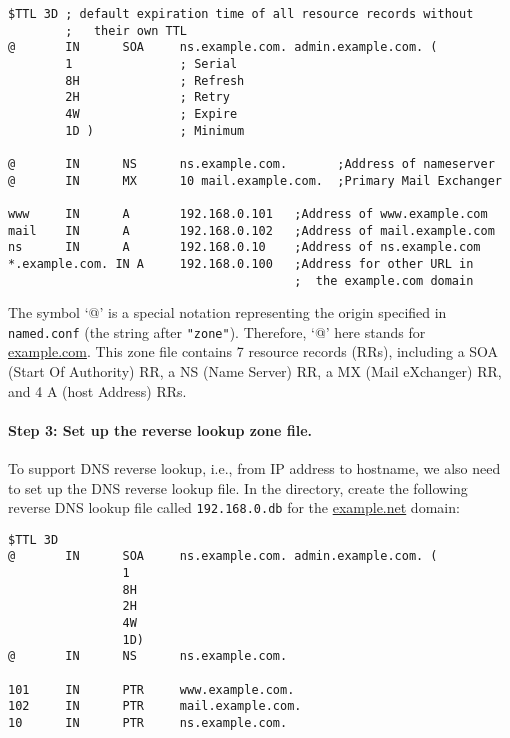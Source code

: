 \vspace{0.2in}
\begin{lstlisting}
$TTL 3D ; default expiration time of all resource records without
        ;   their own TTL
@       IN      SOA     ns.example.com. admin.example.com. (
        1               ; Serial
        8H              ; Refresh
        2H              ; Retry
        4W              ; Expire
        1D )            ; Minimum

@       IN      NS      ns.example.com.       ;Address of nameserver
@       IN      MX      10 mail.example.com.  ;Primary Mail Exchanger

www     IN      A       192.168.0.101   ;Address of www.example.com
mail    IN      A       192.168.0.102   ;Address of mail.example.com
ns      IN      A       192.168.0.10    ;Address of ns.example.com
*.example.com. IN A     192.168.0.100   ;Address for other URL in
                                        ;  the example.com domain
\end{lstlisting}


The symbol `@' is a special notation representing the origin specified
in {\tt named.conf} (the string after \texttt{"zone"}).  Therefore,
`@' here stands for \url{example.com}.
This zone file contains 7 resource records (RRs), including
a SOA (Start Of Authority) RR, a
NS (Name Server) RR, a MX (Mail eXchanger) RR, and 4 A (host Address) RRs.


\paragraph{Step 3: Set up the reverse lookup zone file.}
To support DNS reverse lookup, i.e., from IP address to hostname, we also need to
set up the DNS reverse lookup file.
In the  directory, create the following reverse DNS lookup file
called \texttt{192.168.0.db} for the \url{example.net} domain:
\begin{lstlisting}
$TTL 3D
@       IN      SOA     ns.example.com. admin.example.com. (
                1
                8H
                2H
                4W
                1D)
@       IN      NS      ns.example.com.

101     IN      PTR     www.example.com.
102     IN      PTR     mail.example.com.
10      IN      PTR     ns.example.com.
\end{lstlisting}


